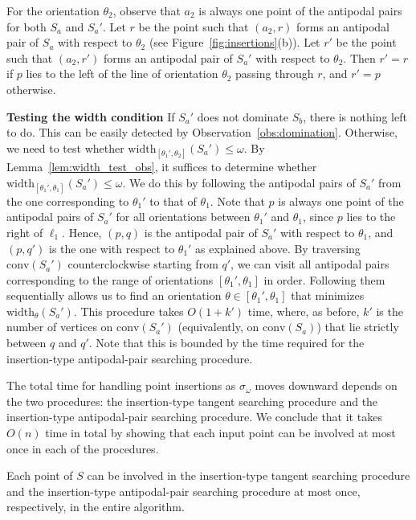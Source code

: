 \documentclass[english,a4paper, cleveref, autoref, thm-restate, nolineno]{socg-lipics-v2021}
\theoremstyle{star}
\theoremstyle{claimstar}
\newcommand{\width}{\ensuremath{\mathrm{width}}}
\newcommand{\conv}{\ensuremath{\mathrm{conv}}}
\begin{document}
For the orientation $\theta_2$, observe that $a_2$ is always one point of the antipodal pairs for both $S_a$ and $S_a'$. 
Let $r$ be the point such that $(a_2, r)$ forms an antipodal pair of $S_a$ with respect to $\theta_2$ (see Figure~\ref{fig:insertions}(b)). 
Let $r'$ be the point such that $(a_2, r')$ forms an antipodal pair of $S_a'$ with respect to $\theta_2$. 
Then $r' = r$ if $p$ lies to the left of the line of orientation $\theta_2$ passing through $r$, and $r' = p$ otherwise. 

\textbf{Testing the width condition }
If $S_a'$ does not dominate $S_b$, there is nothing left to do.
This can be easily detected by Observation~\ref{obs:domination}.
Otherwise, we need to test whether $\width_{[\theta_1', \theta_2]}(S_a') \le \omega$.
By Lemma~\ref{lem:width_test_obs}, it suffices to determine whether $\width_{[\theta_1', \theta_1]}(S_a') \le \omega$.
We do this by following the antipodal pairs of $S_a'$ from the one corresponding to $\theta_1'$ to that of $\theta_1$.
Note that $p$ is always one point of the antipodal pairs of $S_a'$ for all orientations between $\theta_1'$ and $\theta_1$, since $p$ lies to the right of $\ell_1$.
Hence, $(p, q)$ is the antipodal pair of $S_a'$ with respect to $\theta_1$, and $(p, q')$ is the one with respect to $\theta_1'$ as explained above.
By traversing $\conv(S_a')$ counterclockwise starting from $q'$, we can visit all antipodal pairs corresponding to the range of orientations $[\theta_1', \theta_1]$ in order.
Following them sequentially allows us to find an orientation $\theta \in [\theta_1', \theta_1]$ that minimizes $\width_\theta(S_a')$.
This procedure takes $O(1 + k')$ time, where, as before, $k'$ is the number of vertices on $\conv(S_a')$ (equivalently, on $\conv(S_a)$) that lie strictly between $q$ and $q'$.
Note that this is bounded by the time required for the insertion-type antipodal-pair searching procedure.





\medbreak
The total time for handling point insertions as $\sigma_\omega$ moves downward depends on the two procedures: the insertion-type tangent searching procedure and the insertion-type antipodal-pair searching procedure. 
We conclude that it takes $O(n)$ time in total by showing that each input point can be involved at most once in each of the procedures.


\begin{lemma}
    \label{lem:insertion_time}
    Each point of $S$ can be involved in the insertion-type tangent searching procedure and the insertion-type antipodal-pair searching procedure at most once, respectively, in the entire algorithm.
\end{lemma}
\end{document}
